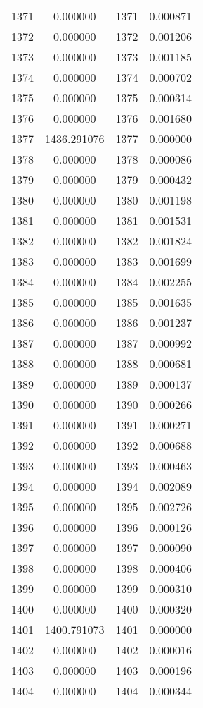 \documentclass[12pt]{article}
\begin{document}
\begin{longtable}{@{}cccc@{}}
1371 & 0.000000 & 1371 & 0.000871 \\
1372 & 0.000000 & 1372 & 0.001206 \\
1373 & 0.000000 & 1373 & 0.001185 \\
1374 & 0.000000 & 1374 & 0.000702 \\
1375 & 0.000000 & 1375 & 0.000314 \\
1376 & 0.000000 & 1376 & 0.001680 \\
1377 & 1436.291076 & 1377 & 0.000000 \\
1378 & 0.000000 & 1378 & 0.000086 \\
1379 & 0.000000 & 1379 & 0.000432 \\
1380 & 0.000000 & 1380 & 0.001198 \\
1381 & 0.000000 & 1381 & 0.001531 \\
1382 & 0.000000 & 1382 & 0.001824 \\
1383 & 0.000000 & 1383 & 0.001699 \\
1384 & 0.000000 & 1384 & 0.002255 \\
1385 & 0.000000 & 1385 & 0.001635 \\
1386 & 0.000000 & 1386 & 0.001237 \\
1387 & 0.000000 & 1387 & 0.000992 \\
1388 & 0.000000 & 1388 & 0.000681 \\
1389 & 0.000000 & 1389 & 0.000137 \\
1390 & 0.000000 & 1390 & 0.000266 \\
1391 & 0.000000 & 1391 & 0.000271 \\
1392 & 0.000000 & 1392 & 0.000688 \\
1393 & 0.000000 & 1393 & 0.000463 \\
1394 & 0.000000 & 1394 & 0.002089 \\
1395 & 0.000000 & 1395 & 0.002726 \\
1396 & 0.000000 & 1396 & 0.000126 \\
1397 & 0.000000 & 1397 & 0.000090 \\
1398 & 0.000000 & 1398 & 0.000406 \\
1399 & 0.000000 & 1399 & 0.000310 \\
1400 & 0.000000 & 1400 & 0.000320 \\
1401 & 1400.791073 & 1401 & 0.000000 \\
1402 & 0.000000 & 1402 & 0.000016 \\
1403 & 0.000000 & 1403 & 0.000196 \\
1404 & 0.000000 & 1404 & 0.000344 \\

\end{longtable}
\end{document}
